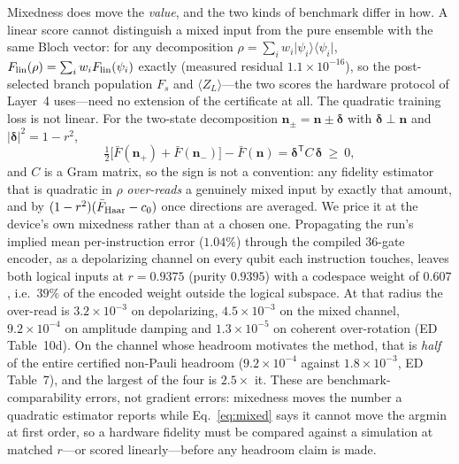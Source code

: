 \documentclass[aps,prxquantum,reprint,superscriptaddress]{revtex4-2}
\newcommand{\ket}[1]{\lvert #1\rangle}
\newcommand{\bra}[1]{\langle #1\rvert}
\begin{document}
Mixedness does move the \emph{value}, and the two kinds of benchmark differ in
how. A linear score cannot distinguish a mixed input from the pure ensemble with
the same Bloch vector: for any decomposition
$\rho=\sum_iw_i\ket{\psi_i}\!\bra{\psi_i}$,
$F_{\rm lin}(\rho)=\sum_iw_iF_{\rm lin}(\psi_i)$ exactly (measured residual
$1.1\times10^{-16}$), so the post-selected branch population $F_s$ and
$\langle Z_L\rangle$---the two scores the hardware protocol of Layer~4
uses---need no extension of the certificate at all. The quadratic training loss is
not linear. For the two-state decomposition
$\mathbf n_\pm=\mathbf n\pm\boldsymbol\delta$ with $\boldsymbol\delta\perp\mathbf
n$ and $|\boldsymbol\delta|^2=1-r^2$,
\begin{equation}
\tfrac12\big[\bar F(\mathbf n_+)+\bar F(\mathbf n_-)\big]-\bar F(\mathbf n)
=\boldsymbol\delta^{\mathsf T}C\,\boldsymbol\delta\ \ge\ 0 ,
\label{eq:overread}
\end{equation}
and $C$ is a Gram matrix, so the sign is not a convention: any fidelity estimator
that is quadratic in $\rho$ \emph{over-reads} a genuinely mixed input by exactly
that amount, and by $(1-r^2)(\bar F_{\rm Haar}-c_0)$ once directions are averaged.
We price it at the device's own mixedness rather than at a chosen one. Propagating
the run's implied mean per-instruction error ($1.04\%$) through the compiled
$36$-gate encoder, as a depolarizing channel on every qubit each instruction
touches, leaves both logical inputs at $r=0.9375$ (purity $0.9395$) with a
codespace weight of $0.607$, i.e.\ $39\%$ of the encoded weight outside the
logical subspace. At that radius the over-read is $3.2\times10^{-3}$ on
depolarizing, $4.5\times10^{-3}$ on the mixed channel, $9.2\times10^{-4}$ on
amplitude damping and $1.3\times10^{-5}$ on coherent over-rotation
(ED Table~10d). On the channel
whose headroom motivates the method, that is \emph{half} of the entire certified
non-Pauli headroom ($9.2\times10^{-4}$ against $1.8\times10^{-3}$, ED Table~7), and
the largest of the four is $2.5\times$ it. These are benchmark-comparability
errors, not gradient errors: mixedness moves the number a quadratic estimator
reports while Eq.~\eqref{eq:mixed} says it cannot move the argmin at first order,
so a hardware fidelity must be compared against a simulation at matched $r$---or
scored linearly---before any headroom claim is made.
\end{document}
